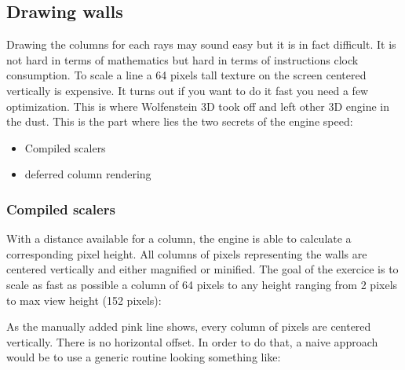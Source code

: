  \begin{minipage}{\textwidth}
 
\centering
\vspace*{0.5cm}
\centering


 \end{minipage}


 \par
 
 \begin{minipage}{\textwidth}
\centering
\vspace*{0.5cm}
\centering
\end{minipage}













\subsection{Drawing walls}
Drawing the columns for each rays may sound easy but it is in fact difficult. It is not hard in terms of mathematics but hard in terms of instructions clock consumption. To scale a line a 64 pixels tall texture on the screen centered vertically is expensive. It turns out if you want to do it fast you need a few optimization. This is where Wolfenstein 3D took off and left other 3D engine in the dust. This is the part where lies the two secrets of the engine speed:
\begin{itemize}
\item Compiled scalers
\item deferred column rendering
\end{itemize}
\par

\subsubsection{Compiled scalers}
With a distance available for a column, the engine is able to calculate a corresponding pixel height. All columns of pixels representing the walls are centered vertically and either magnified or minified. The goal of the exercice is to scale as fast as possible a column of 64 pixels to any height ranging from 2 pixels to max view height (152 pixels):\\
\par
 \begin{figure}[H]
\centering
 \end{figure}
\par
As the manually added pink line shows, every column of pixels are centered vertically. There is no horizontal offset. In order to do that, a naive approach would be to use a generic routine looking something like:\\


